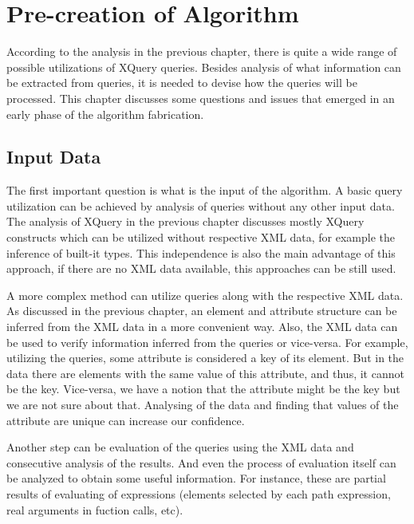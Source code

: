 \chapter{Pre-creation of Algorithm}
According to the analysis in the previous chapter, there is quite a wide range of possible utilizations of XQuery queries. Besides analysis of what information can be extracted from queries, it is needed to devise how the queries will be processed. This chapter discusses some questions and issues that emerged in an early phase of the algorithm fabrication.

\section{Input Data}
The first important question is what is the input of the algorithm. A basic query utilization can be achieved by analysis of queries without any other input data. The analysis of XQuery in the previous chapter discusses mostly XQuery constructs which can be utilized without respective XML data, for example the inference of built-it types. This independence is also the main advantage of this approach, if there are no XML data available, this approaches can be still used. 

A more complex method can utilize queries along with the respective XML data. As discussed in the previous chapter, an element and attribute structure can be inferred from the XML data in a more convenient way. Also, the XML data can be used to verify information inferred from the queries or vice-versa. For example, utilizing the queries, some attribute is considered a key of its element. But in the data there are elements with the same value of this attribute, and thus, it cannot be the key. Vice-versa, we have a notion that the attribute might be the key but we are not sure about that. Analysing of the data and finding that values of the attribute are unique can increase our confidence. 

Another step can be evaluation of the queries using the XML data and consecutive analysis of the results. And even the process of evaluation itself can be analyzed to obtain some useful information. For instance, these are partial results of evaluating of expressions (elements selected by each path expression, real arguments in fuction calls, etc).


